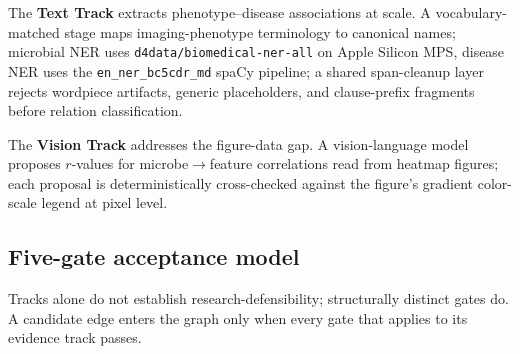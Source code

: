 \documentclass[10pt,twocolumn,letterpaper]{article}
\begin{document}
The \textbf{Text Track} extracts phenotype--disease associations at scale. A
vocabulary-matched stage maps imaging-phenotype terminology to canonical
names; microbial NER uses \texttt{d4data/biomedical-ner-all} on Apple Silicon
MPS, disease NER uses the \texttt{en\_ner\_bc5cdr\_md} spaCy pipeline; a
shared span-cleanup layer rejects wordpiece artifacts, generic placeholders,
and clause-prefix fragments before relation classification.

The \textbf{Vision Track} addresses the figure-data gap. A vision-language
model proposes $r$-values for microbe$\rightarrow$feature correlations read
from heatmap figures; each proposal is deterministically cross-checked
against the figure's gradient color-scale legend at pixel level.

\subsection{Five-gate acceptance model}
\label{sec:gates}

Tracks alone do not establish research-defensibility; structurally distinct
gates do. A candidate edge enters the graph only when every gate that applies
to its evidence track passes.
\end{document}
